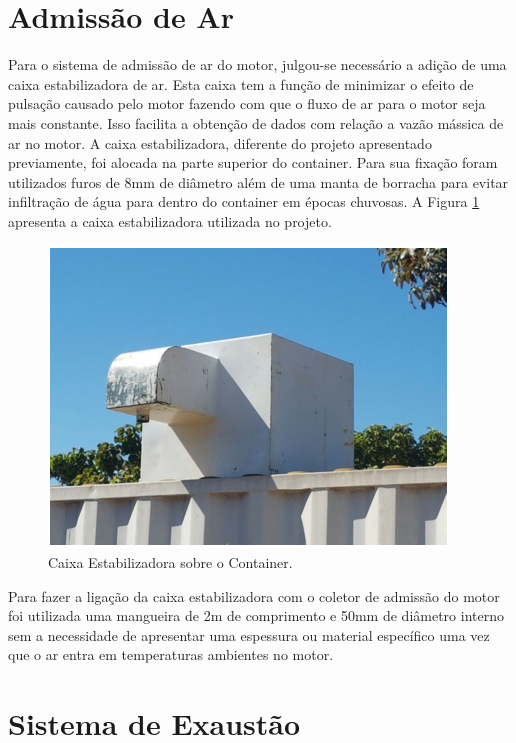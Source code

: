 \section{Admissão de Ar}

Para o sistema de admissão de ar do motor, julgou-se necessário a adição de uma caixa estabilizadora de ar. Esta caixa tem a função de minimizar o efeito de pulsação causado pelo motor fazendo com que o fluxo de ar para o motor seja mais constante. Isso facilita a obtenção de dados com relação a vazão mássica de ar no motor. A caixa estabilizadora, diferente do projeto apresentado previamente, foi alocada na parte superior do container. Para sua fixação foram utilizados furos de 8mm de diâmetro além de uma manta de borracha para evitar infiltração de água para dentro do container em épocas chuvosas. A Figura \ref{fig:caixaestabilizadora} apresenta a caixa estabilizadora utilizada no projeto.

\begin{figure}[h!]
	\centering
	\includegraphics[keepaspectratio=true,scale= 0.6]{figuras/caixa-estabilizadora.png}
	\caption{Caixa Estabilizadora sobre o Container.}
	\label{fig:caixaestabilizadora}
\end{figure}

Para fazer a ligação da caixa estabilizadora com o coletor de admissão do motor foi utilizada uma mangueira de 2m de comprimento e 50mm de diâmetro interno sem a necessidade de apresentar uma espessura ou material específico uma vez que o ar entra em temperaturas ambientes no motor.

\vfill

\section{Sistema de Exaustão}

